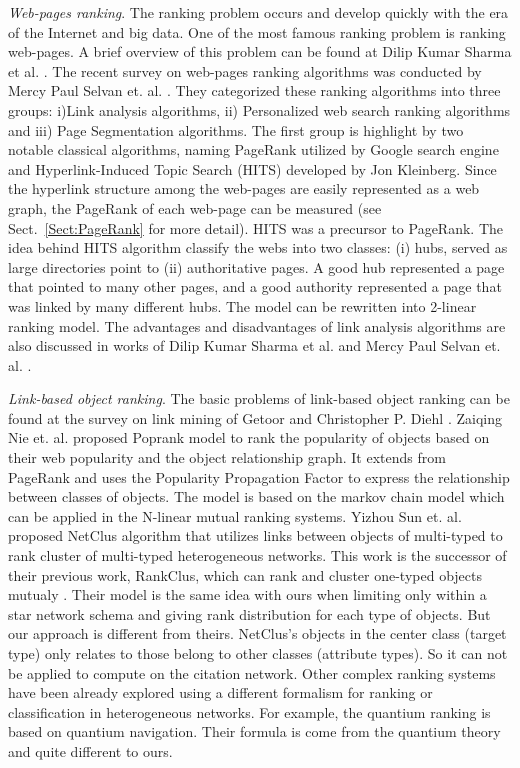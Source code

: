 \documentclass[10pt,leqno,twoside]{article}
\begin{document}
\textit{Web-pages ranking}. The ranking problem occurs and develop quickly with the era of the Internet and big data. One of the most famous ranking problem is ranking web-pages. A brief overview of this problem can be found at Dilip Kumar Sharma et al. \cite{RankOverview}. The recent survey on web-pages ranking algorithms was conducted by Mercy Paul Selvan et. al. \cite{SurveyWebRank}. They categorized these ranking algorithms into three groups: i)Link analysis algorithms, ii) Personalized web search ranking algorithms and iii) Page Segmentation algorithms. 
The first group is highlight by two notable classical algorithms, naming PageRank \cite{pagerank98} utilized by Google search engine and Hyperlink-Induced Topic  Search (HITS) \cite{HITS} developed by Jon Kleinberg.
Since the hyperlink structure among the web-pages are easily represented as a web graph,
the PageRank of each web-page can be measured (see Sect.~\ref{Sect:PageRank} for more detail). HITS was a precursor to PageRank. The idea behind HITS algorithm classify the webs into two classes: (i) hubs, served as large directories point to (ii) authoritative pages. A good hub represented a page that pointed to many other pages, and a good authority represented a page that was linked by many different hubs. The model can be rewritten into 2-linear ranking model.
The advantages and disadvantages of link analysis algorithms are also discussed in works of Dilip Kumar Sharma et al. \cite{RankOverview} and Mercy Paul Selvan et. al. \cite{SurveyWebRank}. 

\textit{Link-based object ranking}. The basic problems of link-based object ranking can be found at the survey on link mining of Getoor and Christopher P. Diehl \cite{LinkMining}. Zaiqing Nie et. al. proposed Poprank model \cite{poprank} to rank the popularity of objects based on their web popularity and the object relationship graph. It extends from PageRank and uses the Popularity Propagation Factor to express the relationship between classes of objects. The model is based on the markov chain model which can be applied in the N-linear mutual ranking systems.
Yizhou Sun et. al. proposed NetClus algorithm \cite{NetClus} that utilizes links between objects of multi-typed to rank cluster of multi-typed heterogeneous networks. This work is the successor of their previous work, RankClus, which can rank and cluster one-typed objects mutualy \cite{RankClus}. Their model is the same idea with ours when limiting only within a star network schema and giving rank distribution for each type of objects. But our approach is different from theirs. NetClus's objects in the center class (target type) only relates to those belong to other classes (attribute types). So it can not be applied to compute on the citation network. Other complex ranking systems have been already explored using a different formalism for ranking or classification in heterogeneous networks. For example, the quantium ranking \cite{complexrank} is based on quantium navigation. Their formula is come from the quantium theory and quite different to ours.
\end{document}
